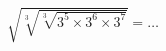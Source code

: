 \documentclass[preview]{standalone}
\begin{document}
\begin{align*}
\sqrt{\sqrt[3]{\sqrt[3]{3^5 \times 3^6 \times 3^7}}} =\dots
\end{align*}
\end{document}
